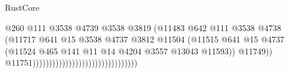 \begin{lexlean}{RustCore}
\begin{coremodule}
                                                                    @260
                                                                    @111
                                                                    @3538
                                                                    @4739
                                                                    @3538
                                                                    @3819
                                                                    (@11483
                                                                      @642
                                                                      @111
                                                                      @3538
                                                                      @4738
                                                                      (@11717
                                                                        @641
                                                                        @15
                                                                        @3538
                                                                        @4737
                                                                        @3812
                                                                        @11504
                                                                        (@11515
                                                                          @641
                                                                          @15
                                                                          @4737
                                                                          (@11524
                                                                            @465
                                                                            @141
                                                                            @11
                                                                            @14
                                                                            @4204
                                                                            @3557
                                                                            @13043
                                                                            @11593))
                                                                        @11749))
                                                                    @11751))))))))))))))))))))))))))))))))

\end{coremodule}
\end{lexlean}
